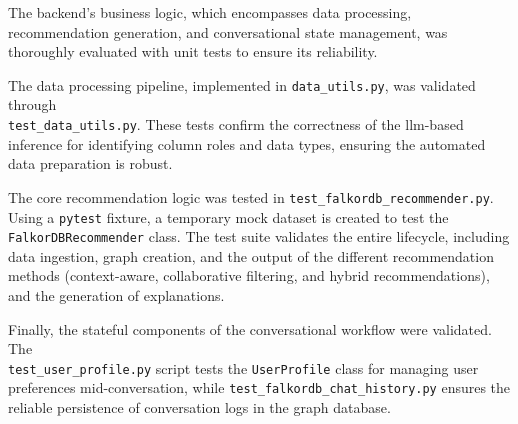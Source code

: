 The backend's business logic, which encompasses data processing, recommendation generation, and conversational state management, was thoroughly evaluated with unit tests to ensure its reliability.

The data processing pipeline, implemented in \texttt{data\_utils.py}, was validated through \\ \texttt{test\_data\_utils.py}. These tests confirm the correctness of the \acs{llm}-based inference for identifying column roles and data types, ensuring the automated data preparation is robust.

The core recommendation logic was tested in \texttt{test\_falkordb\_recommender.py}. Using a \texttt{pytest} fixture, a temporary mock dataset is created to test the \texttt{FalkorDBRecommender} class. The test suite validates the entire lifecycle, including data ingestion, graph creation, and the output of the different recommendation methods (context-aware, collaborative filtering, and hybrid recommendations), and the generation of explanations.

Finally, the stateful components of the conversational workflow were validated. The \\ \texttt{test\_user\_profile.py} script tests the \texttt{UserProfile} class for managing user preferences mid-conversation, while \texttt{test\_falkordb\_chat\_history.py} ensures the reliable persistence of conversation logs in the graph database.